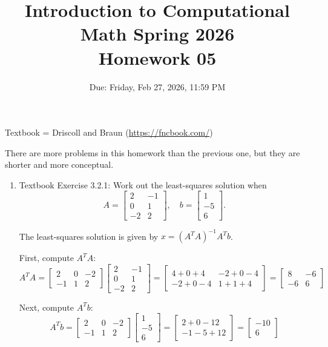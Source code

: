 \documentclass[reqno, answers]{exam}
\title{Introduction to Computational Math Spring 2026 \\ Homework 05}
\date{Due: Friday, Feb 27, 2026, 11:59 PM}
\author{}
\begin{document}
\maketitle
\thispagestyle{empty}

Textbook = Driscoll and Braun (\url{https://fncbook.com/})

There are more problems in this homework than the previous one, but they are shorter and more conceptual.


\begin{enumerate}

\item Textbook Exercise 3.2.1: Work out the least-squares solution when
\[
A = \begin{bmatrix} 2 & -1 \\ 0 & 1 \\ -2 & 2 \end{bmatrix}, \quad b = \begin{bmatrix} 1 \\ -5 \\ 6 \end{bmatrix}.
\]

\begin{solution}
The least-squares solution is given by $x = (A^T A)^{-1} A^T b$.

First, compute $A^T A$:
\[
A^T A = \begin{bmatrix} 2 & 0 & -2 \\ -1 & 1 & 2 \end{bmatrix} \begin{bmatrix} 2 & -1 \\ 0 & 1 \\ -2 & 2 \end{bmatrix} = \begin{bmatrix} 4+0+4 & -2+0-4 \\ -2+0-4 & 1+1+4 \end{bmatrix} = \begin{bmatrix} 8 & -6 \\ -6 & 6 \end{bmatrix}
\]

Next, compute $A^T b$:
\[
A^T b = \begin{bmatrix} 2 & 0 & -2 \\ -1 & 1 & 2 \end{bmatrix} \begin{bmatrix} 1 \\ -5 \\ 6 \end{bmatrix} = \begin{bmatrix} 2 + 0 - 12 \\ -1 - 5 + 12 \end{bmatrix} = \begin{bmatrix} -10 \\ 6 \end{bmatrix}
\]


\end{solution}
\end{enumerate}
\end{document}
